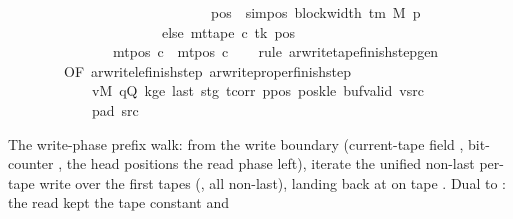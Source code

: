 \begin{isabellebody}
\ \ \ \ \ \ \ \ \ \ \ \ \ \ \ \ \ \ \ \ \ \ \ \ \ \ \ \ \ {\isacharparenleft}{\kern0pt}pos\ {\isacharminus}{\kern0pt}\ sim{\isacharunderscore}{\kern0pt}pos\ {\isacharparenleft}{\kern0pt}block{\isacharunderscore}{\kern0pt}width\ {\isacharparenleft}{\kern0pt}{\isasymGamma}{\isacharunderscore}{\kern0pt}tm\ M{\isacharparenright}{\kern0pt}{\isacharparenright}{\kern0pt}\ p{\isacharparenright}{\kern0pt}\isanewline
\ \ \ \ \ \ \ \ \ \ \ \ \ \ \ \ \ \ \ \ \ \ else\ mt{\isacharunderscore}{\kern0pt}tape\ c{\isacharprime}{\kern0pt}\ tk\ pos{\isacharparenright}{\kern0pt}{\isacharparenright}{\kern0pt}{\isacharparenright}{\kern0pt}\isanewline
\ \ \ \ \ \ \ \ \ \ \ \ \ \ {\isasymand}\ mt{\isacharunderscore}{\kern0pt}pos\ c{\isacharprime}{\kern0pt}{\isacharprime}{\kern0pt}\ {\isacharequal}{\kern0pt}\ mt{\isacharunderscore}{\kern0pt}pos\ c{\isacharprime}{\kern0pt}{\isachardoublequoteclose}\isanewline
%
\isadelimproof
\ \ %
\endisadelimproof
%
\isatagproof
{}\isamarkupfalse%
\ {\isacharparenleft}{\kern0pt}rule\ ar{\isacharunderscore}{\kern0pt}write{\isacharunderscore}{\kern0pt}tape{\isacharunderscore}{\kern0pt}finish{\isacharunderscore}{\kern0pt}step{\isacharunderscore}{\kern0pt}gen\isanewline
\ \ \ \ \ \ \ \ {\isacharbrackleft}{\kern0pt}OF\ ar{\isacharunderscore}{\kern0pt}write{\isacharunderscore}{\kern0pt}le{\isacharunderscore}{\kern0pt}finish{\isacharunderscore}{\kern0pt}step\ ar{\isacharunderscore}{\kern0pt}write{\isacharunderscore}{\kern0pt}proper{\isacharunderscore}{\kern0pt}finish{\isacharunderscore}{\kern0pt}step\isanewline
\ \ \ \ \ \ \ \ \ \ \ \ vM\ qQ\ kge{}\ last\ stg\ tcorr\ ppos\ poskle\ buf{\isacharunderscore}{\kern0pt}valid\ vsrc\isanewline
\ \ \ \ \ \ \ \ \ \ \ \ pad{}\ src{}{\isacharbrackright}{\kern0pt}{\isacharparenright}{\kern0pt}%
\endisatagproof
{\isafoldproof}%
%
\isadelimproof
%
\endisadelimproof
%
\begin{isamarkuptext}%
The write-phase prefix walk: from the write boundary
  (current-tape field , bit-counter
  , the head positions the read phase left), iterate the
  unified non-last per-tape write  over the
  first  tapes (, all non-last),
  landing back at  on tape .
  Dual to : the read kept the tape constant and

\end{isamarkuptext}
\end{isabellebody}
